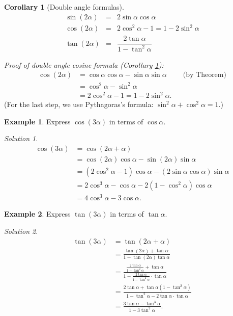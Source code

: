 \documentclass[
  12pt,
  oneside]{book}
\newtheorem{corollary}{Corollary}[chapter]
\theoremstyle{definition}
\theoremstyle{definition}
\newtheorem{example}{Example}[chapter]
\theoremstyle{definition}
\theoremstyle{definition}
\theoremstyle{remark}
\newtheorem*{solution}{Solution}
\begin{document}
\begin{corollary}[Double angle formulas]
\protect\hypertarget{cor:t20-double}{}\label{cor:t20-double}\[\boxed{
\begin{array}{rcl}
\sin(2\alpha) &=& 2\sin\alpha\cos\alpha\\
\cos(2\alpha) &=& 2\cos^2\alpha - 1 = 1-2\sin^2\alpha\\
\tan(2\alpha) &=& \dfrac{2\tan\alpha}{1-\tan^2\alpha}
\end{array}
}\]
\end{corollary}

\emph{Proof of double angle cosine formula (Corollary \ref{cor:t20-double}):}
\begin{align*}
\cos(2\alpha) &= \cos\alpha\cos\alpha - \sin\alpha\sin\alpha   &&\text{(by Theorem)}\\
&= \cos^2\alpha-\sin^2\alpha\\
&= 2\cos^2\alpha - 1 = 1-2\sin^2\alpha.
\end{align*}
(For the last step, we use Pythagoras's formula: \(\sin^2\alpha+\cos^2\alpha=1\).)

\begin{example}
Express \(\cos(3\alpha)\) in terms of \(\cos\alpha\).
\end{example}

\begin{solution}
\begin{align*}
\cos(3\alpha) &=
\cos(2\alpha+\alpha) \\
&= \cos(2\alpha)\cos\alpha - \sin(2\alpha)\sin\alpha\\
&= (2\cos^2\alpha-1)\cos\alpha - (2\sin\alpha\cos\alpha)\sin\alpha\\
&= 2\cos^3\alpha - \cos\alpha - 2(1-\cos^2\alpha)\cos\alpha\\
&= 4\cos^3\alpha - 3\cos\alpha.
\end{align*}
\end{solution}

\begin{example}
Express \(\tan(3\alpha)\) in terms of \(\tan\alpha\).
\end{example}

\begin{solution}
\begin{align*}
\tan(3\alpha) &=
  \tan(2\alpha+\alpha)\\
&=\frac{\tan(2\alpha)+\tan\alpha}{1-\tan(2\alpha)\tan\alpha}\\
&=\frac{\frac{2\tan\alpha}{1-\tan^2\alpha}+\tan\alpha}{1-\frac{2\tan\alpha}{1-\tan^2\alpha}\cdot\tan\alpha}\\
&=\frac{2\tan\alpha+\tan\alpha(1-\tan^2\alpha)}{1-\tan^2\alpha - 2\tan\alpha\cdot\tan\alpha}\\
&=\frac{3\tan\alpha-\tan^3\alpha}{1-3\tan^2\alpha}.
\end{align*}
\end{solution}
\end{document}
